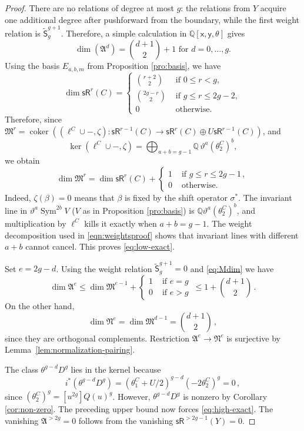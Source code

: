\documentclass[11pt]{article}
\def\QQ{\mathbb{Q}}
\def\sR{\mathsf{sR}}
\newcommand{\sfS}{\mathsf{S}}
\newcommand{\sh}{\sigma}
\theoremstyle{definition}
\begin{document}
\begin{proof}
There are no relations of degree at most $g$: the relations from $Y$ acquire
one additional degree after pushforward from the boundary, while the first
weight relation is $\widetilde{\sfS}_g^{g+1}$. Therefore, a simple calculation in $\QQ[\mathsf{x}, \mathsf{y}, \theta]$ gives
$$
\dim (\mathfrak A^d) = \binom{d+1}{2} +1 \text{ for } d =0,\ldots , g.
$$
Using the basis $E_{a,b,m}$ from Proposition \ref{pro:basis}, we have
$$
\dim \sR^r(C) = \begin{cases}
    \binom{r+2}{2}&\text{ if }0\leq r<g,\\[2mm]
  \binom{2g-r}{2}&\text{ if }g\leq r\leq2g-2,\\[2mm]
  0&\text{ otherwise}.
\end{cases}
$$
Therefore, since $\mathfrak M^r = \operatorname{coker} \left((\ell^C\cup -, \zeta) : \sR^{r-1}(C) \to  \sR^r(C) \oplus U \sR^{r-1}(C)\right) $, and
$$
\ker (\ell^C\cup -, \zeta) = \bigoplus_{a+b=g-1} \QQ\,\vartheta^a(\theta_2^C)^b,
$$
we obtain
\begin{equation}\label{eq:Mdim}
\dim \mathfrak M^r  = \dim \sR^r(C) + \begin{cases}
    1&\text{ if }g\leq r\leq2g-1\,,\\
 0&\text{ otherwise}.
\end{cases}
\end{equation}
Indeed, $\zeta(\beta)=0$ means that $\beta$ is fixed by the shift
operator $\sh^*$.  The invariant line in
$\vartheta^a\operatorname{Sym}^{2b}V$ ($V$ as in Proposition \ref{pro:basis}) is
$\QQ\vartheta^a(\theta_2^C)^b$, and multiplication by $\ell^C$ kills it
exactly when $a+b=g-1$.  The weight decomposition used in
\eqref{eqn:weightsproof} shows that invariant lines with different $a+b$
cannot cancel.
This proves \eqref{eq:low-exact}.

Set $e=2g-d$. Using the weight relation $\widetilde{\sfS}_g^{g+1}=0$ and \eqref{eq:Mdim} we have
\[
 \dim \mathfrak A^e\leq \dim \mathfrak M^{e-1} + \begin{cases}
     1&\text{ if }e=g\\
     0&\text{ if }e>g
 \end{cases}\, \leq1+\binom{d+1}{2}\,.
\]
On the other hand,
\[
 \dim \mathfrak N^e=\dim \mathfrak M^{d-1}=\binom{d+1}{2}\,,
\]
since they are orthogonal complements. Restriction $\mathfrak A^e\to \mathfrak N^e$ is surjective by Lemma~\ref{lem:normalization-pairing}.

The class $\theta^{g-d}D^g$ lies in the kernel because
\[
 i^*(\theta^{g-d}D^g)
 =(\theta_1^C+U/2)^{g-d}(-2\theta_2^C)^g=0\,,
\]
since $(\theta_2^C)^g = [u^{2g}]Q(u)^g$. However, $\theta^{g-d}D^g$
is nonzero by Corollary \ref{cor:non-zero}. The preceding upper bound now forces
\eqref{eq:high-exact}. The vanishing $\mathfrak A^{>2g}=0$ follows from the vanishing $\sR^{>2g-1}(Y)=0$.
\end{proof}
\end{document}
